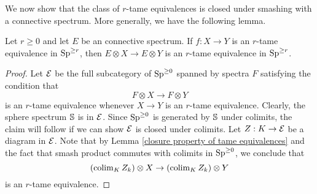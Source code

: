 We now show that the class of $r$-tame equivalences is closed under smashing with a connective spectrum. More generally, we have the following lemma.
\begin{lemma}
\label{Shift of tame equivalences}
Let $r\geq 0$ and
let $E$ be an connective spectrum. If $f:X\to Y$ is an $r$-tame equivalence in $\operatorname{Sp}^{\geq r}$, then $E\otimes X \to E\otimes Y$ is an $r$-tame equivalence in $\operatorname{Sp}^{\geq r}$.
\end{lemma}
\begin{proof}
Let ${\mathcal{E}}$ be the full subcategory of $\operatorname{Sp}^{\geq 0}$ spanned by spectra $F$ satisfying the condition that
$$
F\otimes X \to F\otimes Y
$$
is an $r$-tame equivalence whenever $X\to Y$ is an $r$-tame equivalence. Clearly, the sphere spectrum ${\mathbb{S}}$ is in ${\mathcal{E}}$. 
Since $\operatorname{Sp}^{\geq 0}$ is generated by ${\mathbb{S}}$ under colimits, the claim will follow if we can show ${\mathcal{E}}$ is closed under colimits. Let $Z:K\to {\mathcal{E}}$ be a diagram in ${\mathcal{E}}$.
Note that by Lemma \ref{closure property of tame equivalences} and the fact that smash product commutes with colimits in $\operatorname{Sp}^{\geq 0}$, we conclude that
$$
(\operatorname{colim}_K Z_k )\otimes X \to (\operatorname{colim}_K Z_k )\otimes Y
$$
is an $r$-tame equivalence.

\end{proof}


